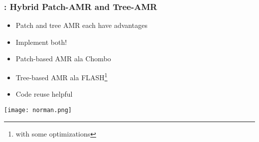 \begin{frame}[fragile] \frametitle{\cello: Hybrid Patch-AMR and Tree-AMR}

\begin{minipage}{2in}
\footnotesize
\begin{itemize}
\item Patch and tree AMR each have advantages
\item Implement both!
\item Patch-based AMR ala Chombo
\item Tree-based AMR ala FLASH\footnote{with some optimizations}
\item Code reuse helpful
\end{itemize}
\end{minipage}
\begin{minipage}{2.0in}
\centerline{\texttt{[image: norman.png]}}
\end{minipage}
\end{frame}
